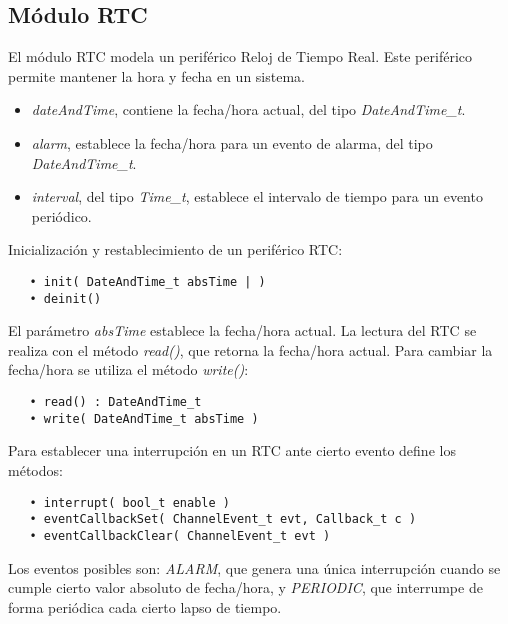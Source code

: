 \subsection{Módulo RTC}

El módulo RTC modela un periférico Reloj de Tiempo Real. Este periférico permite mantener la hora y fecha en un sistema.


\begin{itemize}
\item
\emph{dateAndTime}, contiene la fecha/hora actual, del tipo \emph{DateAndTime\_t}.
\item
\emph{alarm}, establece la fecha/hora para un evento de alarma, del tipo \emph{DateAndTime\_t}.
\item
\emph{interval}, del tipo \emph{Time\_t}, establece el intervalo de tiempo para un evento periódico.
\end{itemize}


Inicialización y restablecimiento de un periférico RTC:

\begin{verbatim}
   • init( DateAndTime_t absTime | )
   • deinit()
\end{verbatim}

El parámetro \emph{absTime} establece la fecha/hora actual. La lectura del RTC se realiza con el método \emph{read()}, que retorna la fecha/hora actual. Para cambiar la fecha/hora se utiliza el método \emph{write()}:

\begin{verbatim}
   • read() : DateAndTime_t
   • write( DateAndTime_t absTime )
\end{verbatim}

Para establecer una interrupción en un RTC ante cierto evento define los métodos: 

\begin{verbatim}
   • interrupt( bool_t enable )
   • eventCallbackSet( ChannelEvent_t evt, Callback_t c )
   • eventCallbackClear( ChannelEvent_t evt )
\end{verbatim}

Los eventos posibles son: \emph{ALARM}, que genera una única interrupción cuando se cumple cierto valor absoluto de fecha/hora, y \emph{PERIODIC}, que interrumpe de forma periódica cada cierto lapso de tiempo.
